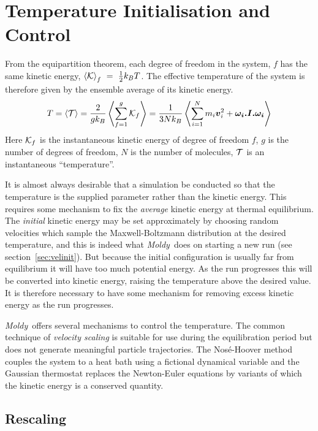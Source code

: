 \documentclass[twoside]{report}
\newcommand{\moldy}{{\em Moldy}}
\newcommand{\bm}[1]{\mbox{\boldmath \protect\(#1\protect\)}}
\begin{document}
\section{Temperature Initialisation and Control}%
From the equipartition theorem, each degree of freedom in the
system, $f$ has the same kinetic energy, $\left < {\cal K} \right >_f~=~\frac{1}{2}k_BT$.  The
effective temperature of the system is therefore given by the ensemble
average of its kinetic energy.
\begin{equation}
\label{eqn:equipartition}
T = \left < {\cal T} \right > = \frac{2}{gk_B}
\left < \sum_{f=1}^{g} {\cal K}_f \right > 
= \frac{1}{3Nk_B}\left < \sum_{i=1}^N  m_i \bm{v}_i^2 
+ \bm{\omega_i.I. \omega_i} \right > 
\end{equation}
Here ${\cal K}_f$ is the instantaneous kinetic energy of degree of
freedom $f$, $g$ is the number of degrees of freedom, $N$ is the
number of molecules, $\cal T$ is an instantaneous ``temperature''.

It is almost always desirable that a simulation be conducted so that
the temperature is the supplied parameter rather than the kinetic
energy.  This requires some mechanism to fix the {\em average\/}
kinetic energy at thermal equilibrium.  The {\em initial\/} kinetic
energy may be set approximately by choosing random velocities which
sample the Maxwell-Boltzmann distribution at the desired temperature,
and this is indeed what \moldy\ does on starting a new run (see
section~\ref{sec:velinit}).  But because the initial configuration is
usually far from equilibrium it will have too much potential energy.
As the run progresses this will be converted into kinetic energy,
raising the temperature above the desired value. It is therefore
necessary to have some mechanism for removing excess kinetic energy as
the run progresses.

\moldy\ offers several mechanisms to control the temperature. The
common technique of {\em velocity scaling}\/ is suitable for use
during the equilibration period but does not generate meaningful
particle trajectories. The Nos\'e-Hoover method couples the system to
a heat bath using a fictional dynamical variable and the Gaussian
thermostat replaces the Newton-Euler equations by variants of which
the kinetic energy is a conserved quantity.

\subsection{Rescaling}
\label{sec:rescaling}
\end{document}
